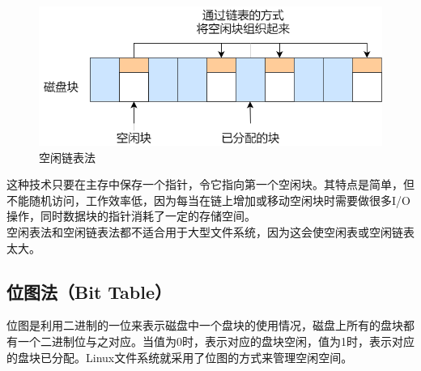 \begin{figure}[H]
    \centering
    \includegraphics[scale=0.5]{img/C5/5-5/2.png}
    \caption{空闲链表法}
\end{figure}

这种技术只要在主存中保存一个指针，令它指向第一个空闲块。其特点是简单，但不能随机访问，工作效率低，因为每当在链上增加或移动空闲块时需要做很多I/O操作，同时数据块的指针消耗了一定的存储空间。\\

空闲表法和空闲链表法都不适合用于大型文件系统，因为这会使空闲表或空闲链表太大。\\

\subsection{位图法（Bit Table）}

位图是利用二进制的一位来表示磁盘中一个盘块的使用情况，磁盘上所有的盘块都有一个二进制位与之对应。当值为0时，表示对应的盘块空闲，值为1时，表示对应的盘块已分配。Linux文件系统就采用了位图的方式来管理空闲空间。